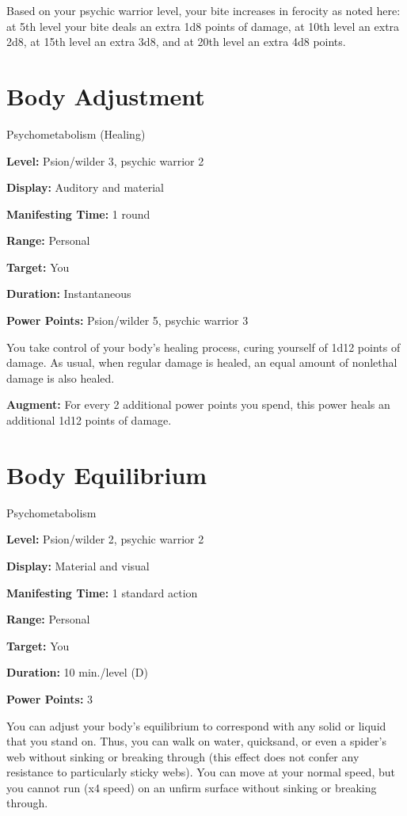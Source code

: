 \documentclass{article}
\begin{document}
Based on your psychic warrior level, your bite increases in ferocity as noted here: 
at 5th level your bite deals an extra 1d8 points of damage, at 10th level an extra 
2d8, at 15th level an extra 3d8, and at 20th level an extra 4d8 points.

\vspace{12pt}
\section*{Body Adjustment}

Psychometabolism (Healing)

\textbf{Level:} Psion/wilder 3, psychic warrior 2

\textbf{Display:} Auditory and material

\textbf{Manifesting Time:} 1 round

\textbf{Range:} Personal

\textbf{Target:} You

\textbf{Duration:} Instantaneous

\textbf{Power Points:} Psion/wilder 5, psychic warrior 3

You take control of your body's healing process, curing yourself of 1d12 points 
of damage. As usual, when regular damage is healed, an equal amount of nonlethal 
damage is also healed.

\textbf{Augment:} For every 2 additional power points you spend, this power heals 
an additional 1d12 points of damage.

\vspace{12pt}
\section*{Body Equilibrium}

Psychometabolism

\textbf{Level:} Psion/wilder 2, psychic warrior 2

\textbf{Display:} Material and visual

\textbf{Manifesting Time:} 1 standard action

\textbf{Range:} Personal

\textbf{Target:} You

\textbf{Duration:} 10 min./level (D)

\textbf{Power Points:} 3

You can adjust your body's equilibrium to correspond with any solid or liquid that 
you stand on. Thus, you can walk on water, quicksand, or even a spider's web without 
sinking or breaking through (this effect does not confer any resistance to particularly 
sticky webs). You can move at your normal speed, but you cannot run (x4 speed) 
on an unfirm surface without sinking or breaking through.
\end{document}
